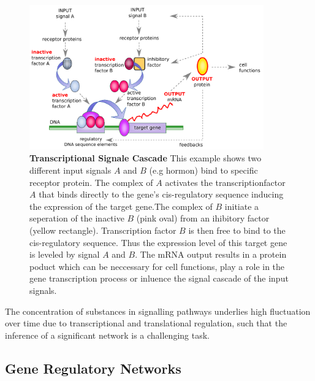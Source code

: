 \begin{figure}[H]
\captionsetup{width=0.9\linewidth}
\centering
\includegraphics[width=0.9\textwidth]{./Bilder/GRN.pdf}
\caption[Transcriptional Signale Cascade]{\textbf{Transcriptional Signale Cascade}
This example shows two different input signals $A$ and $B$ (e.g hormon) bind to specific receptor protein. The complex of $A$ activates the transcriptionfactor $A$ that binds directly to the gene's cis-regulatory sequence inducing the expression of the target gene.The complex of $B$ initiate a seperation of the inactive $B$ (pink oval) from an ihibitory factor (yellow rectangle). Transcription factor $B$ is then free to bind to the cis-regulatory sequence. Thus the expression level of this target gene is leveled by signal $A$ and $B$. The mRNA output results in a protein poduct which can be neccessary for cell functions, play a role in the gene transcription process or inluence the signal cascade of the input signals.
\citep{https://public.ornl.gov/site/gallery/detail.cfm?id=302&topic=&citation=&general=gene20regulatory20network&restsection=all} }
\label{fig:Fig.2.}
\end{figure}


The concentration of substances in signalling pathways underlies high fluctuation over time due to transcriptional and translational regulation, such that the inference of a significant network is a challenging task.%


\subsection*{Gene Regulatory Networks}

